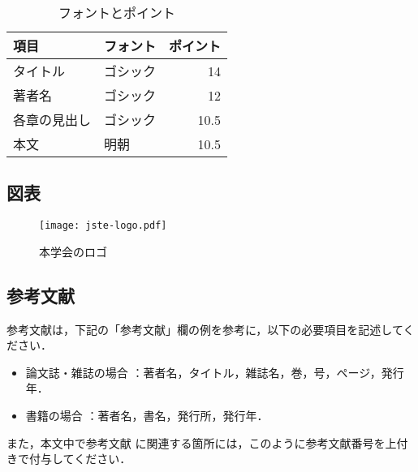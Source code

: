 \documentclass[uplatex, dvipdfmx]{jste-ist}
\begin{document}
\begin{table}[htb]
	\caption{フォントとポイント}
	\begin{tabularx}{\columnwidth}{llr}
		\hline
		\textbf{項目} & \textbf{フォント} & \textbf{ポイント} \\ \hline
		タイトル & ゴシック & 14 \\
		著者名 & ゴシック & 12 \\
		各章の見出し & ゴシック & 10.5 \\
		本文 & 明朝 & 10.5 \\
		\hline
	\end{tabularx}
\end{table}

\subsection{図表}

\begin{figure}[htbp]
\centering
\texttt{[image: jste-logo.pdf]}
\caption{本学会のロゴ}
\label{fig:jste-logo}
\end{figure}


\subsection{参考文献}

参考文献は，下記の「参考文献」欄の例を参考に，以下の必要項目を記述してください． 

\begin{itemize}
\item 論文誌・雑誌の場合
	\cite{sample-article:en}
	\cite{sample-article:ja}
	\cite{sample-article2:ja}
	：著者名，タイトル，雑誌名，巻，号，ページ，発行年．
\item 書籍の場合
	\cite{sample-book:ja}：著者名，書名，発行所，発行年．
\end{itemize}

また，本文中で参考文献
\cite{sample-article:en}
\cite{sample-article:ja}
\cite{sample-article2:ja}
\cite{sample-book:ja}
に関連する箇所には，このように参考文献番号を上付きで付与してください．




\end{document}
